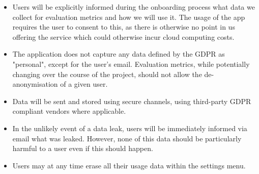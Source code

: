 \begin{itemize}
    \item Users will be explicitly informed during the onboarding process what data we collect for evaluation metrics and how we will use it. The usage of the app requires the user to consent to this, as there is otherwise no point in us offering the service which could otherwise incur cloud computing costs.
    \item The application does not capture any data defined by the GDPR as "personal", except for the user's email. Evaluation metrics, while potentially changing over the course of the project, should not allow the de-anonymisation of a given user.
    \item Data will be sent and stored using secure channels, using third-party GDPR compliant vendors where applicable.
    \item In the unlikely event of a data leak, users will be immediately informed via email what was leaked. However, none of this data should be particularly harmful to a user even if this should happen.
    \item Users may at any time erase all their usage data within the settings menu.
\end{itemize}